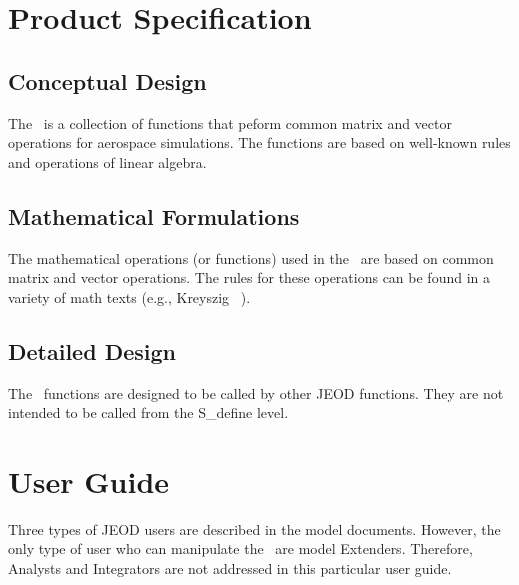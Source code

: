 \chapter{Product Specification}\label{ch:spec}

\section{Conceptual Design}
The \mathDesc\ is a collection of functions that peform common matrix and vector
operations for aerospace simulations.  The functions are based on well-known
rules and operations of linear algebra.

\section{Mathematical Formulations}
The mathematical operations (or functions) used in the \mathDesc\ are based 
on common matrix and vector operations.  The rules for these operations can 
be found in a variety of math texts (e.g., Kreyszig ~\cite{kreyszig1997}).

\section{Detailed Design}
The \mathDesc\ functions are designed to be called by other JEOD functions.  They
are not intended to be called from the S\_define level.


\chapter{User Guide}\label{ch:user}
Three types of JEOD users are described in the model documents.  However, the only
type of user who can manipulate the \mathDesc\ are model Extenders.  Therefore,
Analysts and Integrators are not addressed in this particular user guide.

